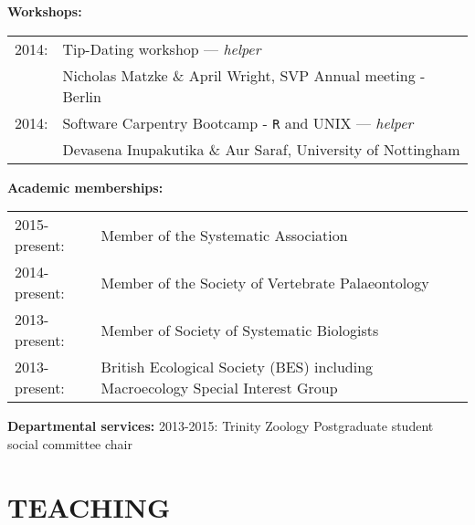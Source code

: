 \documentclass[10pt,a4paper]{article}
\begin{document}
{\raggedright\textbf{Workshops:}

\begin{tabular}{ll}
2014: & Tip-Dating workshop --- \textit{helper}\\
& Nicholas Matzke \& April Wright, SVP Annual meeting - Berlin\\
2014: & Software Carpentry Bootcamp - \texttt{R} and UNIX --- \textit{helper}\\
& Devasena Inupakutika \& Aur Saraf, University of Nottingham\\
\end{tabular}

\bigskip

\raggedright\textbf{Academic memberships:}
\begin{tabular}{ll}
2015-present: & Member of the Systematic Association\\ 
2014-present: & Member of the Society of Vertebrate Palaeontology\\
2013-present: & Member of Society of Systematic Biologists\\
2013-present: & British Ecological Society (BES) including Macroecology Special Interest Group\\
\end{tabular}
\bigskip

\raggedright\textbf{Departmental services:}
2013-2015: Trinity Zoology Postgraduate student social committee chair
\bigskip


\section{TEACHING}
\bigskip

}
\end{document}
